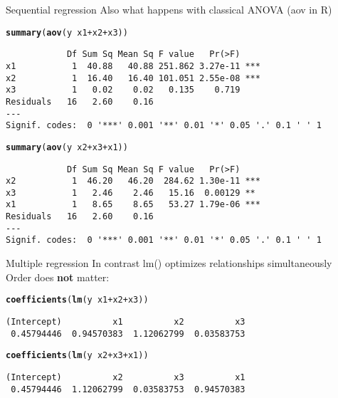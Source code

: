 \documentclass[10pt]{beamer}\usepackage[]{graphicx}\usepackage[]{color}
\makeatletter
\newcommand{\hlopt}[1]{\textcolor[rgb]{0,0,0}{#1}}%
\newcommand{\hlstd}[1]{\textcolor[rgb]{0.345,0.345,0.345}{#1}}%
\newcommand{\hlkwd}[1]{\textcolor[rgb]{0.737,0.353,0.396}{\textbf{#1}}}%
\newenvironment{kframe}{%
 \def\at@end@of@kframe{}%
 \ifinner\ifhmode%
  \def\at@end@of@kframe{\end{minipage}}%
  \begin{minipage}{\columnwidth}%
 \fi\fi%
 \def\FrameCommand##1{\hskip\@totalleftmargin \hskip-\fboxsep
 \colorbox{shadecolor}{##1}\hskip-\fboxsep
     \hskip-\linewidth \hskip-\@totalleftmargin \hskip\columnwidth}%
 \MakeFramed {\advance\hsize-\width
   \@totalleftmargin\z@ \linewidth\hsize
   \@setminipage}}%
 {\par\unskip\endMakeFramed%
 \at@end@of@kframe}
\newenvironment{knitrout}{}{} %
\makeatother
\begin{document}
\begin{frame}[fragile]{Sequential regression}
  Also what happens with classical ANOVA (aov in R)
\begin{knitrout}\small
{}\color{fgcolor}\begin{kframe}
\begin{alltt}
  \hlkwd{summary}\hlstd{(}\hlkwd{aov}\hlstd{(y} \hlopt{~} \hlstd{x1} \hlopt{+} \hlstd{x2} \hlopt{+} \hlstd{x3))}
\end{alltt}
\begin{verbatim}
            Df Sum Sq Mean Sq F value   Pr(>F)    
x1           1  40.88   40.88 251.862 3.27e-11 ***
x2           1  16.40   16.40 101.051 2.55e-08 ***
x3           1   0.02    0.02   0.135    0.719    
Residuals   16   2.60    0.16                     
---
Signif. codes:  0 '***' 0.001 '**' 0.01 '*' 0.05 '.' 0.1 ' ' 1
\end{verbatim}
\begin{alltt}
  \hlkwd{summary}\hlstd{(}\hlkwd{aov}\hlstd{(y} \hlopt{~} \hlstd{x2} \hlopt{+} \hlstd{x3} \hlopt{+} \hlstd{x1))}
\end{alltt}
\begin{verbatim}
            Df Sum Sq Mean Sq F value   Pr(>F)    
x2           1  46.20   46.20  284.62 1.30e-11 ***
x3           1   2.46    2.46   15.16  0.00129 ** 
x1           1   8.65    8.65   53.27 1.79e-06 ***
Residuals   16   2.60    0.16                     
---
Signif. codes:  0 '***' 0.001 '**' 0.01 '*' 0.05 '.' 0.1 ' ' 1
\end{verbatim}
\end{kframe}
\end{knitrout}
\end{frame}

\begin{frame}[fragile]{Multiple regression}
In contrast lm() optimizes relationships simultaneously\\
Order does \textbf{not} matter:
\begin{knitrout}\small
{}\color{fgcolor}\begin{kframe}
\begin{alltt}
  \hlkwd{coefficients}\hlstd{(}\hlkwd{lm}\hlstd{(y} \hlopt{~} \hlstd{x1} \hlopt{+} \hlstd{x2} \hlopt{+} \hlstd{x3))}
\end{alltt}
\begin{verbatim}
(Intercept)          x1          x2          x3 
 0.45794446  0.94570383  1.12062799  0.03583753 
\end{verbatim}
\begin{alltt}
  \hlkwd{coefficients}\hlstd{(}\hlkwd{lm}\hlstd{(y} \hlopt{~} \hlstd{x2} \hlopt{+} \hlstd{x3} \hlopt{+} \hlstd{x1))}
\end{alltt}
\begin{verbatim}
(Intercept)          x2          x3          x1 
 0.45794446  1.12062799  0.03583753  0.94570383 
\end{verbatim}
\end{kframe}
\end{knitrout}

\end{frame}
\end{document}
